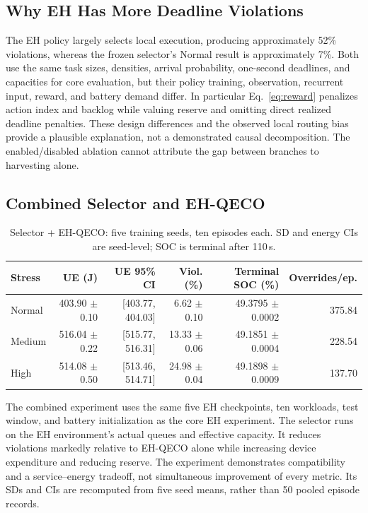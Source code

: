 \documentclass[conference]{IEEEtran}
\begin{document}
\subsection{Why EH Has More Deadline Violations}
The EH policy largely selects local execution, producing approximately 52\% violations, whereas the frozen selector's Normal result is approximately 7\%. Both use the same task sizes, densities, arrival probability, one-second deadlines, and capacities for core evaluation, but their policy training, observation, recurrent input, reward, and battery demand differ. In particular Eq.~\eqref{eq:reward} penalizes action index and backlog while valuing reserve and omitting direct realized deadline penalties. These design differences and the observed local routing bias provide a plausible explanation, not a demonstrated causal decomposition. The enabled/disabled ablation cannot attribute the gap between branches to harvesting alone.

\subsection{Combined Selector and EH-QECO}
\begin{table}[t]
\centering\footnotesize
\caption{Selector + EH-QECO: five training seeds, ten episodes each. SD and energy CIs are seed-level; SOC is terminal after 110\,s.}
\label{tab:combined}
\begin{tabular}{@{}lrrrrr@{}}\toprule
Stress & UE (J) & UE 95\% CI & Viol. (\%) & Terminal SOC (\%) & Overrides/ep.\\\midrule
Normal & 403.90 $\pm$ 0.10 & [403.77, 404.03] & 6.62 $\pm$ 0.10 & 49.3795 $\pm$ 0.0002 & 375.84 \\
Medium & 516.04 $\pm$ 0.22 & [515.77, 516.31] & 13.33 $\pm$ 0.06 & 49.1851 $\pm$ 0.0004 & 228.54 \\
High & 514.08 $\pm$ 0.50 & [513.46, 514.71] & 24.98 $\pm$ 0.04 & 49.1898 $\pm$ 0.0009 & 137.70 \\
\bottomrule\end{tabular}
\end{table}

The combined experiment uses the same five EH checkpoints, ten workloads, test window, and battery initialization as the core EH experiment. The selector runs on the EH environment's actual queues and effective capacity. It reduces violations markedly relative to EH-QECO alone while increasing device expenditure and reducing reserve. The experiment demonstrates compatibility and a service--energy tradeoff, not simultaneous improvement of every metric. Its SDs and CIs are recomputed from five seed means, rather than 50 pooled episode records.
\end{document}
